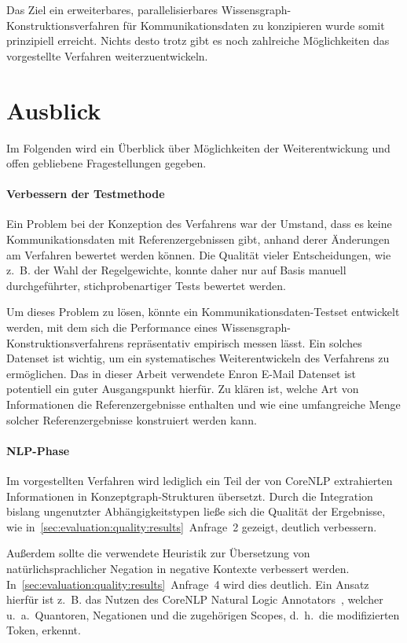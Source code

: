 Das Ziel ein erweiterbares, parallelisierbares Wissensgraph-Konstruktionsverfahren für Kommunikationsdaten zu konzipieren wurde somit prinzipiell erreicht.
Nichts desto trotz gibt es noch zahlreiche Möglichkeiten das vorgestellte Verfahren weiterzuentwickeln.

\section{Ausblick}%
\label{sec:conclusion:todo}

Im Folgenden wird ein Überblick über Möglichkeiten der Weiterentwickung und offen gebliebene Fragestellungen gegeben.

\paragraph{Verbessern der Testmethode}
Ein Problem bei der Konzeption des Verfahrens war der Umstand, dass es keine Kommunikationsdaten mit Referenzergebnissen gibt, anhand derer Änderungen am Verfahren bewertet werden können.
Die Qualität vieler Entscheidungen, wie z.~B. der Wahl der Regelgewichte, konnte daher nur auf Basis manuell durchgeführter, stichprobenartiger Tests bewertet werden.

Um dieses Problem zu lösen, könnte ein Kommunikationsdaten-Testset entwickelt werden, mit dem sich die Performance eines Wissensgraph-Konstruktionsverfahrens repräsentativ empirisch messen lässt.
Ein solches Datenset ist wichtig, um ein systematisches Weiterentwickeln des Verfahrens zu ermöglichen.
Das in dieser Arbeit verwendete Enron E-Mail Datenset ist potentiell ein guter Ausgangspunkt hierfür.
Zu klären ist, welche Art von Informationen die Referenzergebnisse enthalten und wie eine umfangreiche Menge solcher Referenzergebnisse konstruiert werden kann.

\paragraph{NLP-Phase}
Im vorgestellten Verfahren wird lediglich ein Teil der von CoreNLP extrahierten Informationen in Konzeptgraph-Strukturen übersetzt.
Durch die Integration bislang ungenutzter Abhängigkeitstypen ließe sich die Qualität der Ergebnisse, wie in~\ref{sec:evaluation:quality:results}~Anfrage~2 gezeigt, deutlich verbessern.

Außerdem sollte die verwendete Heuristik zur Übersetzung von natürlichsprachlicher Negation in negative Kontexte verbessert werden.
In~\ref{sec:evaluation:quality:results}~Anfrage~4 wird dies deutlich.
Ein Ansatz hierfür ist z.~B. das Nutzen des CoreNLP Natural Logic Annotators~\cite{MacCartney2007}, welcher u.~a.\ Quantoren, Negationen und die zugehörigen Scopes, d.~h.\ die modifizierten Token, erkennt.

